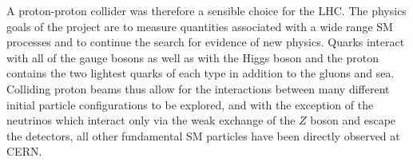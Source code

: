  A proton-proton collider was therefore a 
  sensible choice for the LHC. 
 The physics goals of the project are
  to measure quantities associated with a wide range SM 
  processes and to continue the search for 
  evidence of new physics.
 Quarks interact with all of the gauge bosons
  as well as with the Higgs boson
  and the proton contains the two lightest
  quarks of each type
  in addition to the gluons and sea.
 Colliding proton beams thus allow for
  the interactions between many different
  initial particle configurations to be explored,
  and with the exception of the neutrinos which 
  interact only via the weak exchange of the $Z$
  boson and escape the detectors,
  all other fundamental SM particles have been
  directly  observed  at CERN. 

